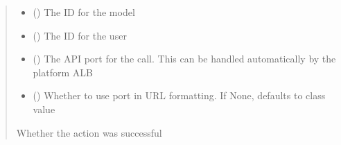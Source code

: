 \documentclass[letterpaper,10pt,english]{sphinxmanual}
\begin{document}
\begin{fulllineitems}
\begin{fulllineitems}
\begin{sphinxVerbatim}[commandchars=\\\{\}]
 
  
 
\end{sphinxVerbatim}
\begin{quote}\begin{description}
\begin{itemize}
\item {} 
\sphinxAtStartPar
{} () \textendash{} The ID for the model

\item {} 
\sphinxAtStartPar
{} () \textendash{} The ID for the user

\item {} 
\sphinxAtStartPar
{} (\sphinxstyleliteralemphasis{\sphinxupquote{ (}}\sphinxstyleliteralemphasis{\sphinxupquote{)}}) \textendash{} The API port for the call. This can be handled automatically by the platform ALB

\item {} 
\sphinxAtStartPar
{} (\sphinxstyleliteralemphasis{\sphinxupquote{ (}}\sphinxstyleliteralemphasis{\sphinxupquote{)}}) \textendash{} Whether to use port in URL formatting. If None, defaults to class value

\end{itemize}

\sphinxAtStartPar
{} \textendash{} Whether the action was successful


\end{description}
\end{quote}
\end{fulllineitems}
\end{fulllineitems}
\end{document}
